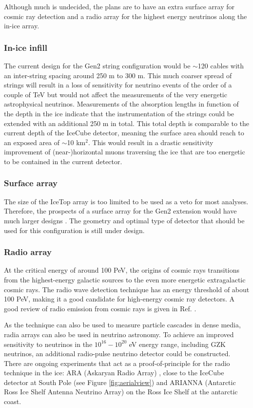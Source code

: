 Although much is undecided, the plans are to have an extra surface array for cosmic ray detection and a radio array for the highest energy neutrinos along the in-ice array.\\

\subsubsection{In-ice infill}
The current design for the Gen2 string configuration would be $\sim$120 cables with an inter-string spacing around 250 m to 300 m. This much coarser spread of strings will result in a loss of sensitivity for neutrino events of the order of a couple of TeV but would not affect the measurements of the very energetic astrophysical neutrinos. Measurements of the absorption lengths in function of the depth in the ice indicate that the instrumentation of the strings could be extended with an additional 250 m in total. This total depth is comparable to the current depth of the IceCube detector, meaning the surface area should reach to an exposed area of $\sim$10 km$^2$. This would result in a drastic sensitivity improvement of (near-)horizontal muons traversing the ice that are too energetic to be contained in the current detector.
\subsubsection{Surface array}
The size of the IceTop array is too limited to be used as a veto for most analyses. Therefore, the prospects of a surface array for the Gen2 extension would have much larger designs \cite{Euler:2015oen}. The geometry and optimal type of detector that should be used for this configuration is still under design.
\subsubsection{Radio array}
\label{subsub:radio}
At the critical energy of around 100 PeV, the origins of cosmic rays transitions from the highest-energy galactic sources to the even more energetic extragalactic cosmic rays. The radio wave detection technique has an energy threshold of about 100 PeV, making it a good candidate for high-energy cosmic ray detectors. A good review of radio emission from cosmic rays is given in Ref. \cite{Schroder:2016hrv}.

As the technique can also be used to measure particle cascades in dense media, radia arrays can also be used in neutrino astronomy. To achieve an improved sensitivity to neutrinos in the $10^{16} - 10^{20}$ eV energy range, including GZK neutrinos, an additional radio-pulse neutrino detector could be constructed. There are ongoing experiments that act as a proof-of-principle for the radio technique in the ice: ARA (Askaryan Radio Array) \cite{Allison:2015eky}, close to the IceCube detector at South Pole (see Figure \ref{fig:aerialview}) and ARIANNA (Antarctic Ross Ice Shelf Antenna Neutrino Array) \cite{Glaser:2018ifj} on the Ross Ice Shelf at the antarctic coast.



